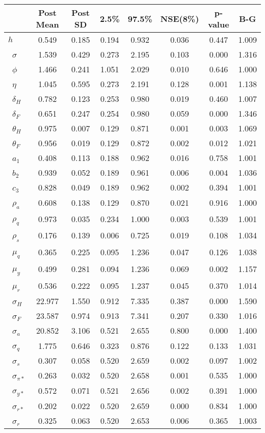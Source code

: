 \begin{tiny}\begin{tabular}{lccccccc}
\hline
&\textbf{Post Mean}&\textbf{Post SD}&\textbf{2.5\%}&\textbf{97.5\%}&\textbf{NSE(8\%)}&\textbf{p-value}&\textbf{B-G}\\\hline
\textbf{$ h             $}&0.549&0.185&0.194&0.932&0.036&0.447&1.009\\\
\textbf{$ \sigma        $}&1.539&0.429&0.273&2.195&0.103&0.000&1.316\\\
\textbf{$ \phi          $}&1.466&0.241&1.051&2.029&0.010&0.646&1.000\\\
\textbf{$ \eta          $}&1.045&0.595&0.273&2.191&0.128&0.001&1.138\\\
\textbf{$ \delta_{H}    $}&0.782&0.123&0.253&0.980&0.019&0.460&1.007\\\
\textbf{$ \delta_{F}    $}&0.651&0.247&0.254&0.980&0.059&0.000&1.346\\\
\textbf{$ \theta_{H}    $}&0.975&0.007&0.129&0.871&0.001&0.003&1.069\\\
\textbf{$ \theta_{F}    $}&0.956&0.019&0.129&0.872&0.002&0.012&1.021\\\
\textbf{$ a_{1}         $}&0.408&0.113&0.188&0.962&0.016&0.758&1.001\\\
\textbf{$ b_{2}         $}&0.939&0.052&0.189&0.961&0.006&0.004&1.036\\\
\textbf{$ c_{3}         $}&0.828&0.049&0.189&0.962&0.002&0.394&1.001\\\
\textbf{$ \rho_{a}      $}&0.608&0.138&0.129&0.870&0.021&0.916&1.000\\\
\textbf{$ \rho_{q}      $}&0.973&0.035&0.234&1.000&0.003&0.539&1.001\\\
\textbf{$ \rho_{s}      $}&0.176&0.139&0.006&0.725&0.019&0.108&1.034\\\
\textbf{$ \mu_{q}       $}&0.365&0.225&0.095&1.236&0.047&0.126&1.038\\\
\textbf{$ \mu_{y}       $}&0.499&0.281&0.094&1.236&0.069&0.002&1.157\\\
\textbf{$ \mu_{r}       $}&0.536&0.222&0.095&1.237&0.045&0.370&1.014\\\
\textbf{$ \sigma_{H}    $}&22.977&1.550&0.912&7.335&0.387&0.000&1.590\\\
\textbf{$ \sigma_{F}    $}&23.587&0.974&0.913&7.341&0.207&0.330&1.016\\\
\textbf{$ \sigma_{a}    $}&20.852&3.106&0.521&2.655&0.800&0.000&1.400\\\
\textbf{$ \sigma_{q}    $}&1.775&0.646&0.323&0.876&0.122&0.133&1.031\\\
\textbf{$ \sigma_{s}    $}&0.307&0.058&0.520&2.659&0.002&0.097&1.002\\\
\textbf{$ \sigma_{\pi*} $}&0.263&0.032&0.520&2.658&0.001&0.535&1.000\\\
\textbf{$ \sigma_{y*}   $}&0.572&0.071&0.521&2.656&0.002&0.391&1.000\\\
\textbf{$ \sigma_{r*}   $}&0.202&0.022&0.520&2.659&0.000&0.834&1.000\\\
\textbf{$ \sigma_{r}    $}&0.325&0.063&0.520&2.653&0.006&0.365&1.003\\\hline
\end{tabular}
\end{tiny}
